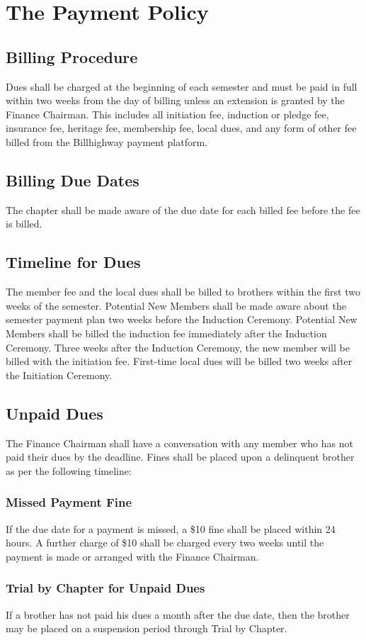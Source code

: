 \chapter{The Payment Policy}
\label{cha:the-payment-policy}

\section{Billing Procedure}

Dues shall be charged at the beginning of each semester and must be paid in
full within two weeks from the day of billing unless an extension is granted by
the Finance Chairman.
This includes all initiation fee, induction or pledge fee, insurance fee,
heritage fee, membership fee, local dues, and any form of other fee billed from
the Billhighway payment platform.

\section{Billing Due Dates}

The chapter shall be made aware of the due date for each billed fee before the
fee is billed. 

\section{Timeline for Dues}

The member fee and the local dues shall be billed to brothers within the first
two weeks of the semester.
Potential New Members shall be made aware about the semester payment plan two
weeks before the Induction Ceremony.
Potential New Members shall be billed the induction fee immediately after the
Induction Ceremony.
Three weeks after the Induction Ceremony, the new member will be billed with
the initiation fee.
First-time local dues will be billed two weeks after the Initiation Ceremony.

\section{Unpaid Dues}

The Finance Chairman shall have a conversation with any member who has not paid
their dues by the deadline.
Fines shall be placed upon a delinquent brother as per the following timeline:

\subsection{Missed Payment Fine}

If the due date for a payment is missed, a \$10 fine shall be placed within 24
hours.
A further charge of \$10 shall be charged every two weeks until the payment is
made or arranged with the Finance Chairman.

\subsection{Trial by Chapter for Unpaid Dues}

If a brother has not paid his dues a month after the due date, then the brother
may be placed on a suspension period through Trial by Chapter.

